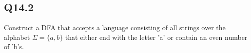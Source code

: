 \documentclass{article}
\begin{document}
\subsection*{Q14.2}
Construct a DFA that accepts a language consisting of all strings over the alphabet \(\Sigma=\{a, b\}\) that either end with the letter 'a' or contain an even number of 'b's.
\newpage
\end{document}
